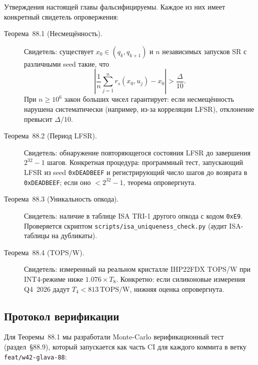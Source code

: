 Утверждения настоящей главы фальсифицируемы.
Каждое из них имеет конкретный свидетель опровержения:

\begin{description}
  \item[Теорема~88.1 (Несмещённость).] Свидетель: существует $x_0 \in (q_k, q_{k+1})$
        и $n$ независимых запусков SR с различными seed такие, что
        \[
          \left|\frac{1}{n}\sum_{j=1}^n r_s(x_0, u_j) - x_0\right| > \frac{\Delta}{10}.
        \]
        При $n \geq 10^6$ закон больших чисел гарантирует:
        если несмещённость нарушена систематически (например,
        из-за корреляции LFSR), отклонение превысит $\Delta/10$.

  \item[Теорема~88.2 (Период LFSR).] Свидетель: обнаружение
        повторяющегося состояния LFSR до завершения $2^{32}-1$ шагов.
        Конкретная процедура: программный тест, запускающий LFSR
        из seed \texttt{0xDEADBEEF} и регистрирующий число шагов
        до возврата в \texttt{0xDEADBEEF}; если оно $< 2^{32}-1$,
        теорема опровергнута.

  \item[Теорема~88.3 (Уникальность опкода).] Свидетель: наличие
        в таблице ISA TRI-1 другого опкода с кодом \texttt{0xE9}.
        Проверяется скриптом \texttt{scripts/isa\_uniqueness\_check.py}
        (аудит ISA-таблицы на дубликаты).

  \item[Теорема~88.4 (TOPS/W).] Свидетель: измеренный на реальном
        кристалле IHP22FDX TOPS/W при INT4-режиме ниже
        $1{.}076 \times T_8$.  Конкретно: если силиконовые измерения
        Q4~2026 дадут $T_4 < 813\,\text{TOPS/W}$,
        нижняя оценка опровергнута.
\end{description}

\subsection{Протокол верификации}
\label{ssec:glava88-verify-protocol}

Для Теоремы~88.1 мы разработали Monte-Carlo верификационный
тест (раздел~\S{}88.9), который запускается как часть CI
для каждого коммита в ветку \texttt{feat/w42-glava-88}:

